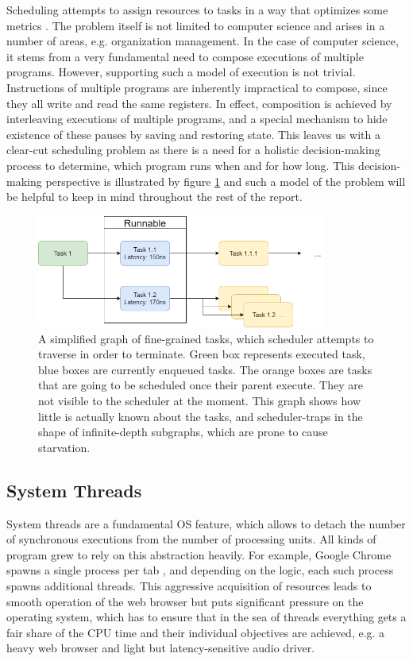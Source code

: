 \documentclass[12pt,a4paper,twoside]{report}
\begin{document}
Scheduling attempts to assign resources to tasks in a way that optimizes some metrics \cite{Pinedo2012}. The problem itself is not limited to computer science and arises in a number of areas, e.g. organization management. In the case of computer science, it stems from a very fundamental need to compose executions of multiple programs. However, supporting such a model of execution is not trivial. Instructions of multiple programs are inherently impractical to compose, since they all write and read the same registers. In effect, composition is achieved by interleaving executions of multiple programs, and a special mechanism to hide existence of these pauses by saving and restoring state. This leaves us with a clear-cut scheduling problem as there is a need for a holistic decision-making process to determine, which program runs when and for how long. This decision-making perspective is illustrated by figure \ref{fig:sched-graph} and such a model of the problem will be helpful to keep in mind throughout the rest of the report. 


\begin{figure}
     \centering
     \includegraphics[width=0.85\textwidth]{scheduler_graph.png}
     \caption{A simplified graph of fine-grained tasks, which scheduler attempts to traverse in order to terminate. Green box represents executed task, blue boxes are currently enqueued tasks. The orange boxes are tasks that are going to be scheduled once their parent execute. They are not visible to the scheduler at the moment. This graph shows how little is actually known about the tasks, and scheduler-traps in the shape of infinite-depth subgraphs, which are prone to cause starvation.}
    \label{fig:sched-graph}
\end{figure}


\subsection{System Threads}
\label{section:system-threads}
System threads are a fundamental OS feature, which allows to detach the number of synchronous executions from the number of processing units. All kinds of program grew to rely on this abstraction heavily. For example, Google Chrome spawns a single process per tab \cite{Howwebbr64:online}, and depending on the logic, each such process spawns additional threads. This aggressive acquisition of resources leads to smooth operation of the web browser but puts significant pressure on the operating system, which has to ensure that in the sea of threads everything gets a fair share of the CPU time and their individual objectives are achieved, e.g. a heavy web browser and light but latency-sensitive audio driver.
\end{document}

